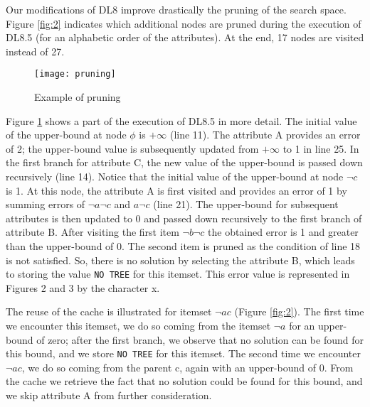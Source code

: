 Our modifications of DL8 improve drastically the pruning of the search space. Figure \ref{fig:2} indicates which additional nodes are pruned during the execution of DL8.5 (for an alphabetic order of the attributes). At the end, 17 nodes are visited instead of 27.

\begin{figure}
	\centering
	\texttt{[image: pruning]}
	\caption{ Example of pruning}
	\label{fig:3}
\end{figure}

Figure \ref{fig:3} shows a part of the execution of DL8.5 in more detail. The initial value of the upper-bound at node $\phi$ is $+\infty$ (line 11). The attribute A provides an error of 2; the upper-bound value is subsequently updated from $+\infty$ to 1 in line 25. In the first branch for attribute C, the new value of the upper-bound is passed down recursively (line 14). Notice that the initial value of the upper-bound at node $\neg c$ is 1. At this node, the attribute A is first visited and provides an error of 1 by summing errors of $\neg a\neg c$ and $a\neg c$ (line 21). The upper-bound for subsequent attributes is then updated to 0 and passed down recursively to the first branch of attribute B. After visiting the first item $\neg b\neg c$ the obtained error is 1 and greater than the upper-bound of 0. The second item is pruned as the condition of line 18 is not satisfied. So, there is no solution by selecting the attribute B, which leads to storing the value \verb|NO TREE| for this itemset. This error value is represented in Figures 2 and 3 by the character x.

The reuse of the cache is illustrated for itemset $\neg ac$ (Figure \ref{fig:2}). The first time we encounter this itemset, we do so coming from the itemset $\neg a$ for an upper-bound of zero; after the first branch, we observe that no solution can be found for this bound, and we store \verb|NO TREE| for this itemset. The second time we encounter $\neg ac$, we do so coming from the parent c, again with an upper-bound of 0. From the cache we retrieve the fact that no solution could be found for this bound, and we skip attribute A from further consideration.